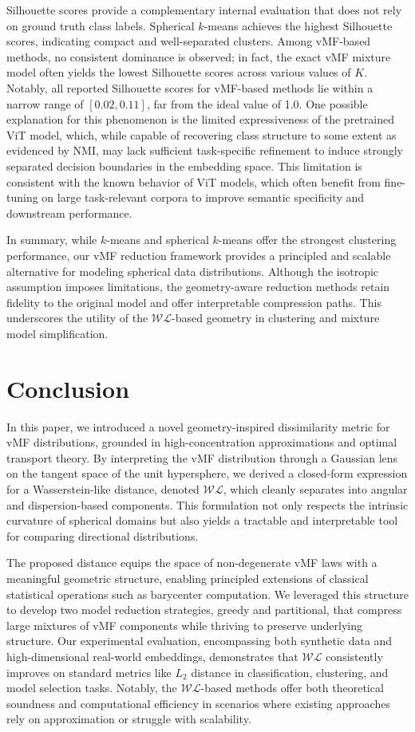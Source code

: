 \documentclass[10pt]{article}
\newcommand{\WL}{\mathcal{WL}}
\begin{document}
Silhouette scores provide a complementary internal evaluation that does not rely on ground truth class labels. Spherical $k$-means achieves the highest Silhouette scores, indicating compact and well-separated clusters. Among vMF-based methods, no consistent dominance is observed; in fact, the exact vMF mixture model often yields the lowest Silhouette scores across various values of $K$. Notably, all reported Silhouette scores for vMF-based methods lie within a narrow range of $[0.02, 0.11]$, far from the ideal value of 1.0. One possible explanation for this phenomenon is the limited expressiveness of the pretrained ViT model, which, while capable of recovering class structure to some extent as evidenced by NMI, may lack sufficient task-specific refinement to induce strongly separated decision boundaries in the embedding space. This limitation is consistent with the known behavior of ViT models, which often benefit from fine-tuning on large task-relevant corpora to improve semantic specificity and downstream performance.


In summary, while $k$-means and spherical $k$-means offer the strongest clustering performance, our vMF reduction framework provides a principled and scalable alternative for modeling spherical data distributions. Although the isotropic assumption imposes limitations, the geometry-aware reduction methods retain fidelity to the original model and offer interpretable compression paths. This underscores the utility of the $\WL$-based geometry in clustering and mixture model simplification.




\section{Conclusion}

In this paper, we introduced a novel geometry-inspired dissimilarity metric for vMF distributions, grounded in high-concentration approximations and optimal transport theory. By interpreting the vMF distribution through a Gaussian lens on the tangent space of the unit hypersphere, we derived a closed-form expression for a Wasserstein-like distance, denoted $\WL$, which cleanly separates into angular and dispersion-based components. This formulation not only respects the intrinsic curvature of spherical domains but also yields a tractable and interpretable tool for comparing directional distributions.

The proposed distance equips the space of non-degenerate vMF laws with a meaningful geometric structure, enabling principled extensions of classical statistical operations such as barycenter computation. We leveraged this structure to develop two model reduction strategies, greedy and partitional, that compress large mixtures of vMF components while thriving to preserve underlying structure. Our experimental evaluation, encompassing both synthetic data and high-dimensional real-world embeddings, demonstrates that $\WL$ consistently improves on standard metrics like $L_2$ distance in classification, clustering, and model selection tasks. Notably, the $\WL$-based methods offer both theoretical soundness and computational efficiency in scenarios where existing approaches rely on approximation or struggle with scalability.
\end{document}
